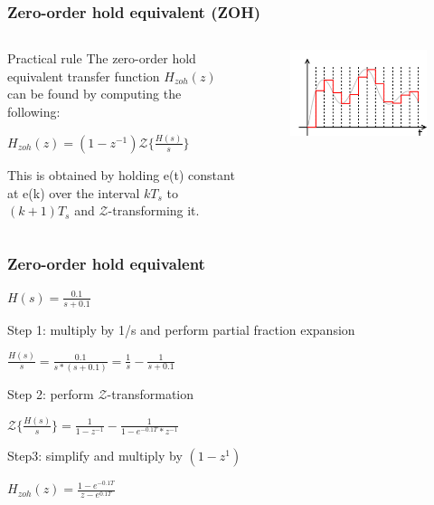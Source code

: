 \begin{frame}
	\frametitle{Zero-order hold equivalent (ZOH)}
\begin{columns}
	\begin{column}{0.5\textwidth}
	\begin{block}{Practical rule}
		The zero-order hold equivalent transfer function $H_{zoh}(z)$ can be found by computing the following:
		\begin{center}
			$H_{zoh}(z) = (1 - z^{-1}) \mathcal{Z}\{\frac{H(s)}{s}\}$
		\end{center}
		This is obtained by holding e(t) constant at e(k) over the interval $kT_s$ to $(k+1)T_s$ and $\mathcal{Z}$-transforming it.
	\end{block}
	\end{column}
	
	\begin{column}{0.5\textwidth}
		\begin{figure}
			\centering
			\includegraphics[width=1\linewidth]{zero-order}
		\end{figure}
	\end{column}
\end{columns}
\end{frame}

\begin{frame}
	\frametitle{Zero-order hold equivalent}
	\begin{example}
		\begin{center}
			$H(s) = \frac{0.1}{s + 0.1}$
		\end{center}
		Step 1: multiply by 1/s and perform partial fraction expansion
		\begin{center}
			$\frac{H(s)}{s} = \frac{0.1}{s * (s + 0.1)} = \frac{1}{s} - \frac{1}{s + 0.1}$
		\end{center}
		Step 2: perform $\mathcal{Z}$-transformation
		\begin{center}
			$\mathcal{Z} \{\frac{H(s)}{s}\} = \frac{1}{1 - z^{-1}} - \frac{1}{1 - e^{-0.1T} * z^{-1}}$
		\end{center}
		Step3: simplify and multiply by $(1-z^{1})$
		\begin{center}
			$H_{zoh}(z) = \frac{1 - e^{-0.1T}}{z - e^{0.1T}}$
		\end{center}
	\end{example}
\end{frame}

